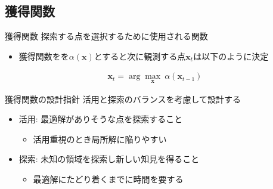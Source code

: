 \documentclass[dvipdfmx, 10.5pt]{beamer}
\begin{document}
\subsection{獲得関数}
\begin{frame}{\insertsubsection}
	\begin{block}{獲得関数}
		探索する点を選択するために使用される関数 %
	\end{block}
	\begin{itemize}
		\item 獲得関数をを$\alpha(\bm x)$とすると次に観測する点$\bm x_t$は以下のように決定
	\end{itemize}
	\begin{align*}
		\bm x_t = \arg \max_{\bm x} ~ \alpha(\bm x_{t-1})
	\end{align*}
	\begin{block}{獲得関数の設計指針}
		\textcolor{myorange}{活用と探索のバランス}を考慮して設計する
	\end{block}
	\begin{itemize}
		\item 活用: 最適解がありそうな点を探索すること
		\begin{itemize}
			\item 活用重視のとき局所解に陥りやすい
		\end{itemize}
		\vspace{3pt}
		\item 探索: 未知の領域を探索し新しい知見を得ること
		\begin{itemize}
			\item 最適解にたどり着くまでに時間を要する
		\end{itemize}
	\end{itemize}

\end{frame}

\end{document}
